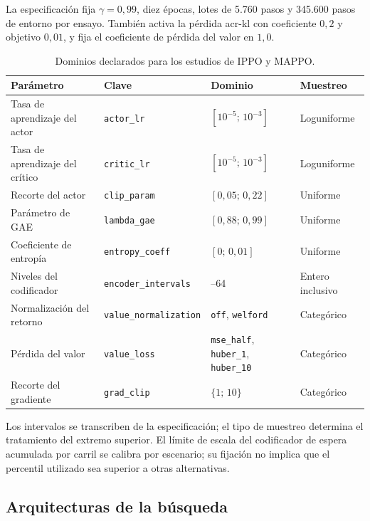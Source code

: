 La especificación fija $\gamma=0{,}99$, diez épocas, lotes de 5.760 pasos y 345.600 pasos de entorno por ensayo. También activa la pérdida \acrshort{acr-kl} con coeficiente $0{,}2$ y objetivo $0{,}01$, y fija el coeficiente de pérdida del valor en $1{,}0$.

\begin{table}[H]\centering\small
\caption{Dominios declarados para los estudios de IPPO y MAPPO.}\label{tab:dominios_ippo_mappo}
\setlength{\tabcolsep}{4pt}
\begin{tabular}{@{}>{\raggedright\arraybackslash}p{3.8cm}>{\raggedright\arraybackslash}p{4cm}>{\raggedright\arraybackslash}p{3.6cm}>{\raggedright\arraybackslash}p{2.4cm}@{}}\hline
\rowcolor{catAzulCielo!25}
Parámetro & Clave & Dominio & Muestreo \\\hline
Tasa de aprendizaje del actor & \texttt{actor\_lr} & $[10^{-5};\,10^{-3}]$ & Loguniforme \\
Tasa de aprendizaje del crítico & \texttt{critic\_lr} & $[10^{-5};\,10^{-3}]$ & Loguniforme \\
Recorte del actor & \texttt{clip\_param} & $[0{,}05;\,0{,}22]$ & Uniforme \\
Parámetro de GAE & \texttt{lambda\_gae} & $[0{,}88;\,0{,}99]$ & Uniforme \\
Coeficiente de entropía & \texttt{entropy\_coeff} & $[0;\,0{,}01]$ & Uniforme \\
Niveles del codificador & \texttt{encoder\_intervals} & 4--64 & Entero inclusivo \\
Normalización del retorno & \texttt{value\_normalization} & \texttt{off}, \texttt{welford} & Categórico \\
Pérdida del valor & \texttt{value\_loss} & \texttt{mse\_half}, \texttt{huber\_1}, \texttt{huber\_10} & Categórico \\
Recorte del gradiente & \texttt{grad\_clip} & $\{1;\,10\}$ & Categórico \\
\hline
\end{tabular}\end{table}

Los intervalos se transcriben de la especificación; el tipo de muestreo determina el tratamiento del extremo superior. El límite de escala del codificador de espera acumulada por carril se calibra por escenario; su fijación no implica que el \gls{percentil} utilizado sea superior a otras alternativas.

\subsection{Arquitecturas de la búsqueda}
\label{subsec:arquitecturas_busqueda}

